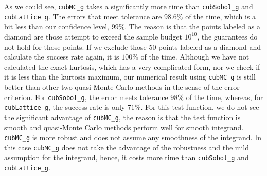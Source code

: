 \documentclass{iitthesis}
\theoremstyle{definition}
\begin{document}
As we could see,  {\tt cubMC\_g} takes a significantly more time than {\tt cubSobol\_g} and {\tt cubLattice\_g}. The errors that meet tolerance are $98.6\%$ of the time, which is a bit less than our confidence level, $99\%$. The reason is that the points labeled as a diamond are those attempt to exceed the sample budget $10^{10}$,  the guarantees do not hold for those points. If we exclude those 50 points labeled as a diamond and calculate the success rate again, it is $100\%$ of the time. Although we have not calculated the exact kurtosis, which has a very complicated form, nor we check if it is less than the kurtosis maximum, our numerical result using {\tt cubMC\_g} is still better than other two quasi-Monte Carlo methods in the sense of the error criterion. For {\tt cubSobol\_g}, the error meets tolerance $98\%$ of the time, whereas, for  {\tt cubLattice\_g}, the success rate is only $71\%$.  For this test function, we do not see the significant advantage of {\tt cubMC\_g}, the reason is that the test function is smooth and quasi-Monte Carlo methods perform well for smooth integrand. {\tt cubMC\_g} is more robust and does not assume any smoothness of the integrand. In this case {\tt cubMC\_g} does not take the advantage of the robustness and the mild assumption for the integrand, hence, it costs more time  than {\tt cubSobol\_g} and {\tt cubLattice\_g}.
\end{document}

